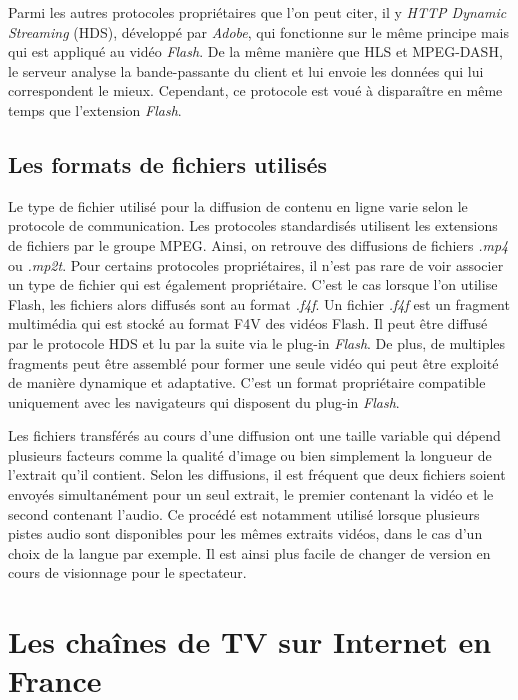 \documentclass{polytech/polytech}
\begin{document}
Parmi les autres protocoles propriétaires que l’on peut citer, il y \textit{HTTP Dynamic Streaming} (HDS), développé par \textit{Adobe}, qui fonctionne sur le même principe mais qui est appliqué au vidéo \textit{Flash}. De la même manière que HLS et MPEG-DASH, le serveur analyse la bande-passante du client et lui envoie les données qui lui correspondent le mieux. Cependant, ce protocole est voué à disparaître en même temps que l’extension \textit{Flash}.


\section{Les formats de fichiers utilisés}

Le type de fichier utilisé pour la diffusion de contenu en ligne varie selon le protocole de communication. Les protocoles standardisés utilisent les extensions de fichiers par le groupe MPEG. Ainsi, on retrouve des diffusions de fichiers \textit{.mp4} ou \textit{.mp2t}. Pour certains protocoles propriétaires, il n'est pas rare de voir associer un type de fichier qui est également propriétaire. C'est le cas lorsque l'on utilise Flash, les fichiers alors diffusés sont au format \textit{.f4f}. Un fichier \textit{.f4f} est un fragment multimédia qui est stocké au format F4V des vidéos Flash. Il peut être diffusé par le protocole HDS et lu par la suite via le plug-in \textit{Flash}. De plus, de multiples fragments peut être assemblé pour former une seule vidéo qui peut être exploité de manière dynamique et adaptative. C'est un format propriétaire compatible uniquement avec les navigateurs qui disposent du plug-in \textit{Flash}.

Les fichiers transférés au cours d'une diffusion ont une taille variable qui dépend plusieurs facteurs comme la qualité d'image ou bien simplement la longueur de l'extrait qu'il contient. Selon les diffusions, il est fréquent que deux fichiers soient envoyés simultanément pour un seul extrait, le premier contenant la vidéo et le second contenant l'audio. Ce procédé est notamment utilisé lorsque plusieurs pistes audio sont disponibles pour les mêmes extraits vidéos, dans le cas d'un choix de la langue par exemple. Il est ainsi plus facile de changer de version en cours de visionnage pour le spectateur. 


\chapter{Les chaînes de TV sur Internet en France}
\end{document}

